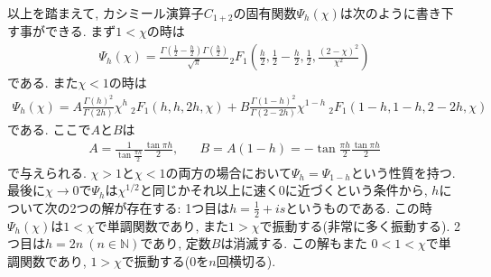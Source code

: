 以上を踏まえて, カシミール演算子$C_{1+2}$の固有関数$\Psi_h(\chi)$は次のように書き下す事ができる. 
まず$1 < \chi$の時は
\begin{align}
	\Psi_h(\chi)
	= \frac{\Gamma\left(\frac{1}{2} - \frac{h}{2}\right)\Gamma\left(\frac{h}{2}\right)}
		{\sqrt{\pi}}
	{}_2F_1\left(\frac{h}{2},\frac{1}{2} - \frac{h}{2},\frac{1}{2},
	\frac{(2 - \chi)^2}{\chi^2}\right)
	\label{eq:Psi_h_for_chi>1}
\end{align}
である. 
また$\chi < 1$の時は
\begin{align}
	\Psi_h(\chi)
	= A\frac{\Gamma(h)^2}{\Gamma(2h)}\chi^h\ {}_2F_1(h, h, 2h, \chi)
	+ B\frac{\Gamma(1-h)^2}{\Gamma(2 - 2h)}\chi^{1-h}\ {}_2F_1(1-h, 1-h, 2-2h, \chi)
	\label{eq:Psi_h_for_chi<1}
\end{align}
である. ここで$A$と$B$は
\begin{align}
	A = \frac{1}{\tan\frac{\pi h}{2}}\frac{\tan\pi h}{2},\hspace{20pt}
	B = A(1 - h) = -\tan\frac{\pi h}{2}\frac{\tan\pi h}{2}
\end{align}
で与えられる. 
$\chi > 1$と$\chi < 1$の両方の場合において$\Psi_h = \Psi_{1-h}$という性質を持つ. 
最後に$\chi \to 0$で$\Psi_h$は$\chi^{1/2}$と同じかそれ以上に速く0に近づくという条件から, 
$h$について次の2つの解が存在する:
1つ目は$h = \frac{1}{2} + is$というものである. 
この時$\Psi_h(\chi)$は$1 < \chi$で単調関数であり, また$1 > \chi$で振動する(非常に多く振動する). 
2つ目は$h = 2n\ (n \in \mathbb{N})$であり, 定数$B$は消滅する. この解もまた
$0 < 1 < \chi$で単調関数であり, $1 > \chi$で振動する(0を$n$回横切る). 

